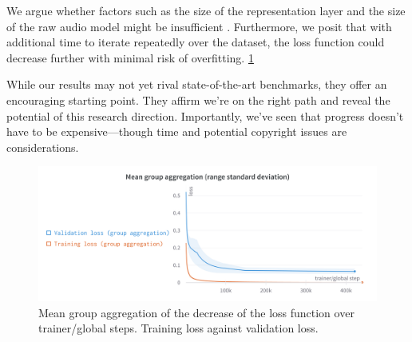 We argue whether factors such as the size of the representation layer and the size of the raw audio model might be insufficient \cite{verydeep}. Furthermore, we posit that with additional time to iterate repeatedly over the dataset, the loss function could decrease further with minimal risk of overfitting. \ref{fig:lossf}

While our results may not yet rival state-of-the-art benchmarks, they offer an encouraging starting point. They affirm we're on the right path and reveal the potential of this research direction. Importantly, we've seen that progress doesn't have to be expensive—though time and potential copyright issues are considerations.

\begin{figure}[h]
    \centering
    \includegraphics[width=\textwidth]{figures/images/Mean group aggregation.png}
    \caption[Loss function performance plot]{Mean group aggregation of the decrease of the loss function over trainer/global steps. Training loss against validation loss.}
    \label{fig:lossf}
\end{figure}



\newpage


